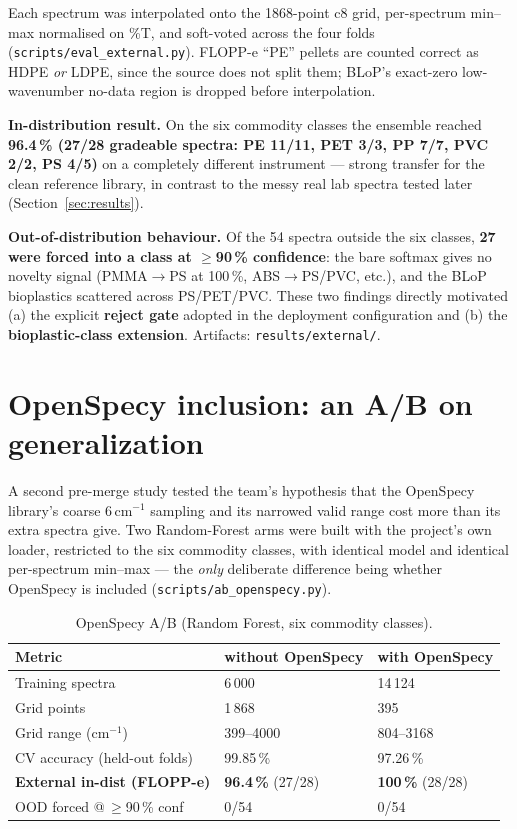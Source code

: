 \documentclass[11pt,a4paper]{article}
\begin{document}
Each spectrum was interpolated onto the 1868-point c8 grid, per-spectrum
min--max normalised on \%T, and soft-voted across the four folds
(\texttt{scripts/eval\_external.py}). FLOPP-e ``PE'' pellets are counted correct
as HDPE \emph{or} LDPE, since the source does not split them; BLoP's exact-zero
low-wavenumber no-data region is dropped before interpolation.

\textbf{In-distribution result.} On the six commodity classes the ensemble
reached \textbf{96.4\,\% (27/28 gradeable spectra: PE 11/11, PET 3/3, PP 7/7,
PVC 2/2, PS 4/5)} on a completely different instrument --- strong transfer for
the clean reference library, in contrast to the messy real lab spectra tested
later (Section~\ref{sec:results}).

\textbf{Out-of-distribution behaviour.} Of the 54 spectra outside the six
classes, \textbf{27 were forced into a class at $\geq$90\,\% confidence}: the
bare softmax gives no novelty signal (PMMA$\to$PS at 100\,\%, ABS$\to$PS/PVC,
etc.), and the BLoP bioplastics scattered across PS/PET/PVC. These two findings
directly motivated (a) the explicit \textbf{reject gate} adopted in the
deployment configuration and (b) the \textbf{bioplastic-class extension}.
Artifacts: \texttt{results/external/}.

\section{OpenSpecy inclusion: an A/B on generalization}

A second pre-merge study tested the team's hypothesis that the OpenSpecy
library's coarse 6\,cm$^{-1}$ sampling and its narrowed valid range cost more
than its extra spectra give. Two Random-Forest arms were built with the
project's own loader, restricted to the six commodity classes, with identical
model and identical per-spectrum min--max --- the \emph{only} deliberate
difference being whether OpenSpecy is included
(\texttt{scripts/ab\_openspecy.py}).

\begin{table}[h]
\centering
\small
\begin{tabular}{lll}
\toprule
Metric & without OpenSpecy & with OpenSpecy \\
\midrule
Training spectra & 6\,000 & 14\,124 \\
Grid points & 1\,868 & 395 \\
Grid range (cm$^{-1}$) & 399--4000 & 804--3168 \\
CV accuracy (held-out folds) & 99.85\,\% & 97.26\,\% \\
\textbf{External in-dist (FLOPP-e)} & \textbf{96.4\,\%} (27/28) & \textbf{100\,\%} (28/28) \\
OOD forced @\,$\geq$90\,\% conf & 0/54 & 0/54 \\
\bottomrule
\end{tabular}
\caption{OpenSpecy A/B (Random Forest, six commodity classes).}
\label{tab:ab}
\end{table}
\end{document}
